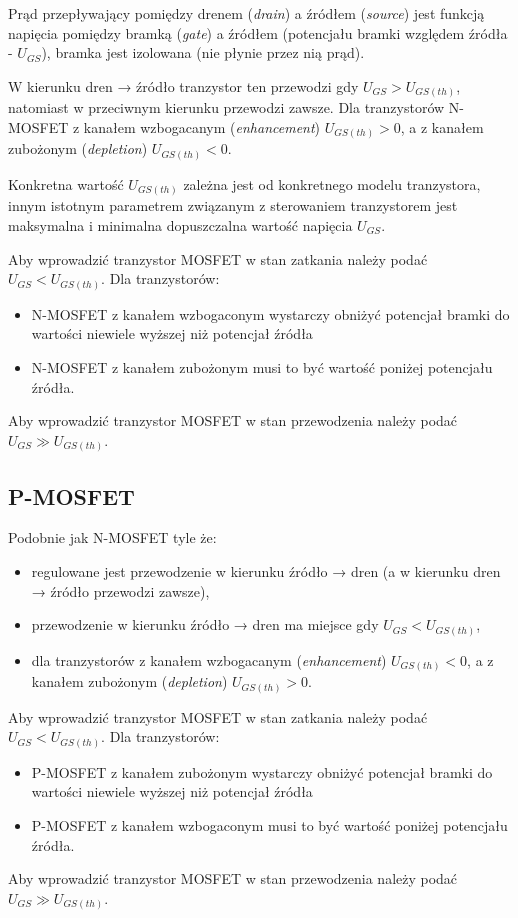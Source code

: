 Prąd przepływający pomiędzy drenem (\emph{drain}) a źródłem (\emph{source}) jest funkcją napięcia pomiędzy bramką (\emph{gate}) a źródłem (potencjału bramki względem źródła - $U_{GS}$), bramka jest izolowana (nie płynie przez nią prąd).

W kierunku dren → źródło tranzystor ten przewodzi gdy $U_{GS} > U_{GS (th)}$, natomiast w przeciwnym kierunku przewodzi zawsze. Dla tranzystorów N-MOSFET z kanałem wzbogacanym (\emph{enhancement}) $U_{GS (th)} > 0$, a z kanałem zubożonym (\emph{depletion}) $U_{GS (th)} < 0$.

Konkretna wartość $U_{GS (th)}$ zależna jest od konkretnego modelu tranzystora, innym istotnym parametrem związanym z sterowaniem tranzystorem jest maksymalna i minimalna dopuszczalna wartość napięcia $U_{GS}$.

Aby wprowadzić tranzystor MOSFET w stan zatkania należy podać $U_{GS} < U_{GS (th)}$. Dla tranzystorów:
\begin{itemize}
\item N-MOSFET z kanałem wzbogaconym wystarczy obniżyć potencjał bramki do wartości niewiele wyższej niż potencjał źródła
\item N-MOSFET z kanałem zubożonym musi to być wartość poniżej potencjału źródła.
\end{itemize}
Aby wprowadzić tranzystor MOSFET w stan przewodzenia należy podać $U_{GS} \gg U_{GS (th)}$.

\subsection{P-MOSFET}
Podobnie jak N-MOSFET tyle że:
\begin{itemize}
\item regulowane jest przewodzenie w kierunku źródło → dren (a w kierunku dren → źródło przewodzi zawsze),
\item przewodzenie w kierunku źródło → dren ma miejsce gdy $U_{GS} < U_{GS (th)}$,
\item dla tranzystorów z kanałem wzbogacanym (\emph{enhancement}) $U_{GS (th)} < 0$, a z kanałem zubożonym (\emph{depletion}) $U_{GS (th)} > 0$.
\end{itemize}

Aby wprowadzić tranzystor MOSFET w stan zatkania należy podać $U_{GS} < U_{GS (th)}$. Dla tranzystorów:
\begin{itemize}
\item P-MOSFET z kanałem zubożonym wystarczy obniżyć potencjał bramki do wartości niewiele wyższej niż potencjał źródła
\item P-MOSFET z kanałem wzbogaconym musi to być wartość poniżej potencjału źródła.
\end{itemize}
Aby wprowadzić tranzystor MOSFET w stan przewodzenia należy podać $U_{GS} \gg U_{GS (th)}$.

